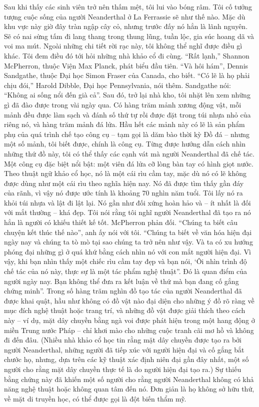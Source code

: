 \begin{multicols}{2}
	\vskip 0.1cm
	Sau khi thấy các sinh viên trở nên thấm mệt, tôi lui vào bóng râm. Tôi cố tưởng tượng cuộc sống của người Neanderthal ở La Ferrassie sẽ như thế nào. Mặc dù khu vực này giờ đây tràn ngập cây cỏ, nhưng trước đấy nó hẳn là lãnh nguyên. Sẽ có nai sừng tấm đi lang thang trong thung lũng, tuần lộc, gia súc hoang dã và voi ma mút. Ngoài những chi tiết rời rạc này, tôi không thể nghĩ được điều gì khác. Tôi đem điều đó tới hỏi những nhà khảo cổ đi cùng.
	\vskip 0.1cm
	“Rất lạnh,” Shannon McPherron, thuộc Viện Max Planck, phát biểu đầu tiên.
	\vskip 0.1cm
	“Và hôi hám”, Dennis Sandgathe, thuộc Đại học Simon Fraser của Canada, cho biết.
	\vskip 0.1cm
	“Có lẽ là họ phải chịu đói,” Harold Dibble, Đại học Pennsylvania, nói thêm.
	\vskip 0.1cm
	Sandgathe nói: “Không ai sống nổi đến già cả”.
	\vskip 0.1cm
	Sau đó, trở lại nhà kho, tôi nhặt lên xem những gì đã đào được trong vài ngày qua. Có hàng trăm mảnh xương động vật, mỗi mảnh đều được làm sạch và đánh số thứ tự rồi được đặt trong túi nhựa nhỏ của riêng nó, và hàng trăm mảnh đá lửa. Hầu hết các mảnh này có lẽ là sản phẩm phụ của quá trình chế tạo công cụ -- tạm gọi là dăm bào thời kỳ Đồ đá -- nhưng một số mảnh, tôi biết được, chính là công cụ. Từng được hướng dẫn cách nhìn những thứ đồ này, tôi có thể thấy các cạnh vát mà người Neanderthal đã chế tác. Một công cụ đặc biệt nổi bật: một viên đá lửa cỡ lòng bàn tay có hình giọt nước. Theo thuật ngữ khảo cổ học, nó là một cái rìu cầm tay, mặc dù nó có lẽ không được dùng như một cái rìu theo nghĩa hiện nay. Nó đã được tìm thấy gần đáy của rãnh, vì vậy nó được ước tính là khoảng $70$ nghìn năm tuổi. Tôi lấy nó ra khỏi túi nhựa và lật đi lật lại. Nó gần như đối xứng hoàn hảo và -- ít nhất là đối với mắt thường -- khá đẹp. Tôi nói rằng tôi nghĩ người Neanderthal đã tạo ra nó hẳn là người có khiếu thiết kế tốt. McPherron phản đối.
	\vskip 0.1cm
	“Chúng ta biết câu chuyện kết thúc thế nào”, anh ấy nói với tôi. “Chúng ta biết về văn hóa hiện đại ngày nay và chúng ta tò mò tại sao chúng ta trở nên như vậy. Và ta có xu hướng phóng đại những gì ở quá khứ bằng cách nhìn nó với con mắt người hiện đại. Vì vậy, khi bạn nhìn thấy một chiếc rìu cầm tay đẹp và bạn nói, ‘Ôi nhìn trình độ chế tác của nó này, thực sự là một tác phẩm nghệ thuật”. Đó là quan điểm của người ngày nay. Bạn không thể đưa ra kết luận về thứ mà bạn đang cố gắng chứng minh”.
	\vskip 0.1cm
	Trong số hàng trăm nghìn đồ tạo tác của người Neanderthal đã được khai quật, hầu như không có đồ vật nào đại diện cho những ý đồ rõ ràng về mục đích nghệ thuật hoặc trang trí, và những đồ vật được giải thích theo cách này -- ví dụ, mặt dây chuyền bằng ngà voi được phát hiện trong một hang động ở miền Trung nước Pháp -- chỉ khơi mào cho những cuộc tranh cãi mơ hồ và không đi đến đâu. (Nhiều nhà khảo cổ học tin rằng mặt dây chuyền được tạo ra bởi người Neanderthal, những người đã tiếp xúc với người hiện đại và cố gắng bắt chước họ, nhưng, dựa trên các kỹ thuật xác định niên đại gần đây nhất, một số người cho rằng mặt dây chuyền thực tế là do người hiện đại tạo ra.) Sự thiếu bằng chứng này đã khiến một số người cho rằng người Neanderthal không có khả năng nghệ thuật hoặc không quan tâm đến nó. Đơn giản là họ không sở hữu thứ, về mặt di truyền học, có thể được gọi là đột biến thẩm mỹ.

\end{multicols}
